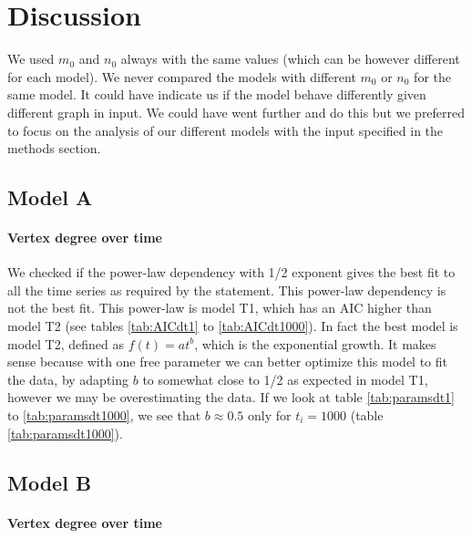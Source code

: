 \documentclass[a4paper]{article}
\begin{document}
\section{Discussion}

We used $m_0$ and $n_0$ always with the same values (which can be however 
different for each model). We never compared the models with different $m_0$ or 
$n_0$ for the same model. It could have indicate us if the model behave 
differently given different graph in input. We could have went further and do 
this but we preferred to focus on the analysis of our different models with the 
input specified in the methods section.

\subsection{Model A}


\paragraph{Vertex degree over time}

We checked if the power-law dependency with 1/2 exponent gives the best fit to 
all the time series as required by the statement. This power-law dependency is 
not the best fit. This power-law is model T1, which has an AIC higher than model 
T2 (see tables \ref{tab:AICdt1} to \ref{tab:AICdt1000}). In fact the best model 
is model T2, defined as $f(t) = at^b$, which is the exponential growth. It makes 
sense because with one free parameter we can better optimize this model to fit 
the data, by adapting $b$ to somewhat close to 1/2 as expected in model T1, 
however we may be overestimating the data.
%
If we look at table \ref{tab:paramsdt1} to \ref{tab:paramsdt1000}, we
see that $b \approx 0.5$ only for $t_i = 1000$ (table \ref{tab:paramsdt1000}).


\subsection{Model B}

\paragraph{Vertex degree over time}
\end{document}
